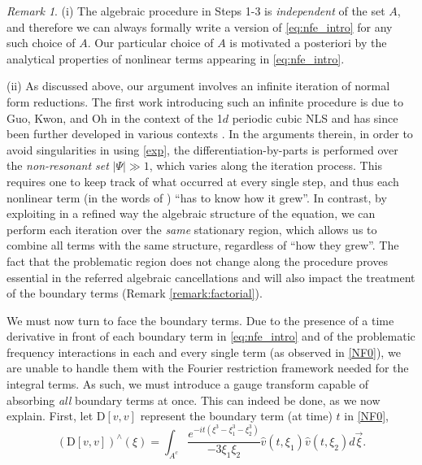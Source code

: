 \documentclass[a4paper,
11pt,  reqno]{amsart}
\newcommand{\5}{\textup{V}}
\newcommand{\noi}{\noindent}
\theoremstyle{remark}
\newtheorem{remark}[theorem]{Remark}
\numberwithin{equation}{section}
\numberwithin{theorem}{section}
\newcommand{\D}{\mathrm{D}}
\begin{document}
\begin{remark}
\rm
(i) The algebraic procedure in Steps 1-3 is \textit{independent} of the set $A$, and therefore we can always formally write a version of \eqref{eq:nfe_intro} for any such choice of $A$.
Our particular choice of $A$ is motivated a posteriori by the analytical properties of nonlinear terms appearing in \eqref{eq:nfe_intro}.


\smallskip


\noi(ii) As discussed above, our argument involves an infinite iteration of normal form reductions. The first work introducing such an infinite procedure is due to Guo, Kwon, and Oh \cite{GuoKwonOh_nls} in the context of the 1$d$ periodic cubic NLS and has since been further developed in various contexts \cite{CS20, kishimoto, Kishimoto_nls,KwonOh_uu_mkdv, KOY20}.
In the arguments therein, in order to avoid singularities in using \eqref{exp}, the differentiation-by-parts is performed over the \emph{non-resonant set} $|\Psi|\gg 1$, which varies along the iteration process. This requires one to keep track of what occurred at every single step, and thus each nonlinear term (in the words of \cite{GuoKwonOh_nls}) ``has to know how it grew''. In contrast, by exploiting in a refined way the algebraic structure of the equation, we can perform each iteration over the \emph{same} stationary region, which allows us to combine all terms with the same structure, regardless of ``how they grew''. The fact that the problematic region does not change along the procedure proves essential in the referred algebraic cancellations and will also impact the treatment of the boundary terms (Remark \ref{remark:factorial}).



\end{remark}


\medskip



We must now turn to face the boundary terms.
Due to the presence of a time derivative in front of each boundary term in \eqref{eq:nfe_intro} and of the problematic frequency interactions in each and every single term (as observed in \eqref{NF0}),  we are unable to handle them with the Fourier restriction framework needed for the integral terms. As such, we must introduce a gauge transform
    capable of absorbing \emph{all} boundary terms at once. This can indeed be done, as we now explain. First, let $\D[v,v]$ represent the  boundary term (at time) $t$ in \eqref{NF0},
\begin{equation}
	(\D[v,v])^\wedge(\xi) =  \int_{A^c}\frac{e^{-it (\xi^3 -
			\xi_1^3 - \xi_2^3) }}{-3\xi_1\xi_2}  \widehat{v}(t, \xi_1) \widehat{v}(t,\xi_2) d\vec{\xi}.\label{eq:D_intro}
\end{equation}
\end{document}
